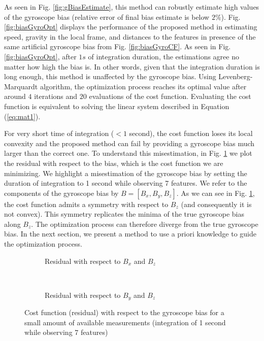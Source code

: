 \documentclass[letterpaper, 10 pt, conference]{ieeeconf}  %
\begin{document}
As seen in Fig. \ref{fig:gBiasEstimate}, this method can robustly estimate high values of the gyroscope bias (relative error of final bias estimate is below $2\%$).
Fig. \ref{fig:biasGyroOpt} displays the performance of the proposed method in estimating speed, gravity in the local frame, and distances to the features in presence of the same artificial gyroscope bias from Fig. \ref{fig:biasGyroCF}.
As seen in Fig. \ref{fig:biasGyroOpt}, after $1s$ of integration duration, the estimations agree no matter how high the bias is.
In other words, given that the integration duration is long enough, this method is unaffected by the gyroscope bias.
Using Levenberg-Marquardt algorithm, the optimization process reaches its optimal value after around $4$ iterations and $20$ evaluations of the cost function.
Evaluating the cost function is equivalent to solving the linear system described in Equation (\ref{eq:mat1}).

\noindent For very short time of integration ($<1$ second), the cost function loses its local convexity and the proposed method can fail by providing a gyroscope bias much larger than the correct one.
To understand this misestimation, in Fig. \ref{fig:cost} we plot the residual with respect to the bias, which is the cost function we are minimizing.
We highlight a misestimation of the gyroscope bias by setting the duration of integration to 1 second while observing 7 features.
We refer to the components of the gyroscope bias by $B = [B_x, B_y, B_z]$.
As we can see in Fig. \ref{fig:cost}, the cost function admits a symmetry with respect to $B_z$ (and consequently it is not convex).
This symmetry replicates the minima of the true gyroscope bias along $B_z$.
The optimization process can therefore diverge from the true gyroscope bias.
In the next section, we present a method to use a priori knowledge to guide the optimization process.

\begin{figure}
        \centering
        \begin{subfigure}[b]{0.489\columnwidth}
                \resizebox{\columnwidth}{!}{}
                \caption{Residual with respect to $B_x$ and $B_z$}
        \end{subfigure}~
        \begin{subfigure}[b]{0.489\columnwidth}
                \resizebox{\columnwidth}{!}{}
                \caption{Residual with respect to $B_y$ and $B_z$}
        \end{subfigure}
        \caption{Cost function (residual) with respect to the gyroscope bias for a small amount of available measurements (integration of 1 second while observing 7 features)\label{fig:cost}}
\end{figure}
\end{document}
